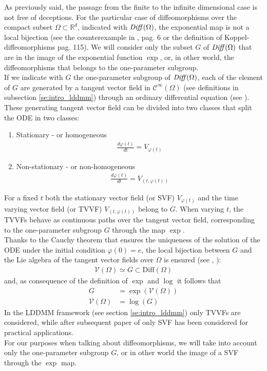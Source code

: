 As previously said, the passage from the finite to the infinite dimensional case is not free of deceptions. For the particular case of diffeomorphisms over the compact subset $\Omega\subset\mathbb{R}^d$, indicated with $\text{\emph{Diff}}(\Omega)$, the exponential map is not a local bijection (see the counterexample in \cite{lorenzi2013geodesics}, pag. 6 or the definition of Koppel-diffeomorphisms \cite{grabowski1988free} pag. 115). 
We will consider only the subset $G$ of $\text{\emph{Diff}}(\Omega)$ that are in the image of the exponential function $\exp$, or, in other world, the diffeomorphisms that belongs to the one-parameter subgroup.\\
If we indicate with $G$ the one-parameter subgroup of $\text{\emph{Diff}}(\Omega)$, each of the element of $G$ are generated by a tangent vector field in $\mathcal{C}^{\infty}(\Omega)$ (see definitions in subsection \ref{se:intro_lddmm}) through an ordinary differential equation (see \cite{arnold2006ordinary}). These generating tangent vector field can be divided into two classes that split the ODE in two classes:
\begin{enumerate}
	\item Stationary  - or homogeneous
	\begin{align*}
	\frac{d\varphi(t)}{dt} = V_{\varphi(t)}
	\end{align*}
	\item Non-stationary - or non-homogeneous
	\begin{align*}
	\frac{d\varphi(t)}{dt} = V_{(t, \varphi(t))}
	\end{align*}
\end{enumerate}
For a fixed $t$ both the stationary vector field (or SVF) $V_{\varphi(t)}$ and the time varying vector field (or TVVF) $V_{(t, \varphi(t))}$ belong to $G$. When varying $t$, the TVVFs behave as continuous paths over the tangent vector field, corresponding to the one-parameter subgroup $G$ through the map $\exp$.\\
Thanks to the Cauchy theorem that ensures the uniqueness of the solution of the ODE under the initial condition $\varphi(0) = e$, the local bijection between $G$ and the Lie algebra of the tangent vector fields over $\Omega$ is ensured (see \cite{milnor1982infinite}, \cite{khesin2008geometry}):
\begin{align*}
\mathcal{V}(\Omega) \simeq  G \subset \text{Diff}(\Omega)
\end{align*}
and, as consequence of the definition of $\exp$ and $\log$ it follows that
\begin{align*}
G &= \exp( \mathcal{V}(\Omega))\\
\mathcal{V}(\Omega) &= \log(G)
\end{align*}
In the LDDMM framework (see section \ref{se:intro_lddmm}) only TVVFs are considered, while after subsequent paper of \cite{arsigny2006log} only SVF has been considered for practical applications.\\
For our purposes when talking about diffeomorphisms, we will take into account only the one-parameter subgroup $G$, or in other world the image of a SVF through the $\exp$ map. 

